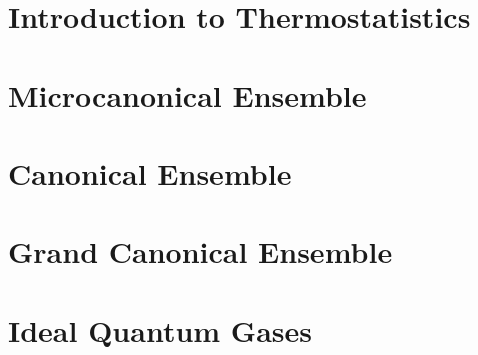 \documentclass{book}
\begin{document}


\tableofcontents
	
	
	
	
\chapter{Introduction to Thermostatistics}
	
\chapter{Microcanonical Ensemble}
	
\chapter{Canonical Ensemble}
	
\chapter{Grand Canonical Ensemble}
	
\chapter{Ideal Quantum Gases}
	
\end{document}
